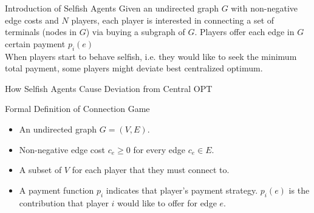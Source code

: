 \documentclass[11pt,aspectratio=169]{beamer}
\begin{document}
\begin{frame}{Introduction of Selfish Agents}
Given an undirected graph \(G\) with non-negative edge costs and \(N\) players, each player is interested in connecting a set of terminals (nodes in \(G\)) via buying a subgraph of \(G\). Players offer each edge in \(G\) certain payment $p_i(e)$\\
\vspace{10pt}
When players start to behave selfish, i.e. they would like to seek the minimum total payment, some players might deviate best centralized optimum. 
\end{frame}
\begin{frame}{How Selfish Agents Cause Deviation from Central OPT}
    \begin{figure}
        \begin{center}
\hspace*{10pt}
\hspace*{10pt}
    
\end{center}
\end{figure}
\end{frame}


\begin{frame}{Formal Definition of Connection Game}
    \begin{definition}
          \begin{itemize}
            \item An undirected graph \(G = (V,E)\).
            \item Non-negative edge cost \(c_e \geq 0\) for every edge $c_e \in E$.
            \item A subset of \(V\) for each player that they must connect to. 
            \item A payment function \(p_i\) indicates that player's payment strategy. \(p_i(e)\) is the contribution that player \(i\) would like to offer for edge \(e\).
    \end{itemize}
    \end{definition}
\end{frame}
\end{document}
